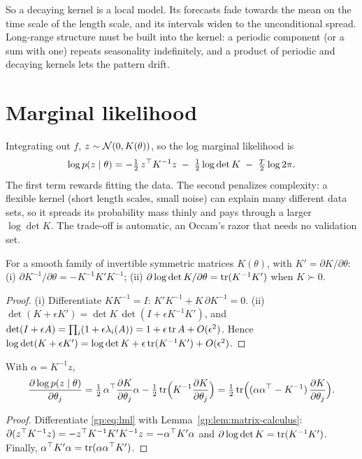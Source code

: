 So a decaying kernel is a local model. Its forecasts fade towards the mean
on the time scale of the length scale, and its intervals widen to the
unconditional spread. Long-range structure must be built into the kernel: a
periodic component (or a sum with one) repeats seasonality indefinitely, and a
product of periodic and decaying kernels lets the pattern drift.

\section{Marginal likelihood}\label{gp:sec:ml}

Integrating out $f$, $z\sim\mathcal{N}(0,K(\theta))$, so the log marginal likelihood is
\begin{equation}\label{gp:eq:lml}
  \log p(z\mid\theta) = -\tfrac12\, z^\top K^{-1}z \;-\; \tfrac12\log\det K \;-\; \tfrac T2\log2\pi .
\end{equation}
The first term rewards fitting the data. The second penalizes complexity: a
flexible kernel (short length scales, small noise) can explain many different
data sets, so it spreads its probability mass thinly and pays through a larger
$\log\det K$. The trade-off is automatic, an Occam's razor that needs no
validation set.

\begin{lemma}\label{gp:lem:matrix-calculus}
For a smooth family of invertible symmetric matrices $K(\theta)$, with $K'=\partial K/\partial\theta$:
(i) $\partial K^{-1}/\partial\theta = -K^{-1}K'K^{-1}$;
(ii) $\partial\log\det K/\partial\theta = \operatorname{tr}(K^{-1}K')$ when $K\succ0$.
\end{lemma}
\begin{proof}
(i) Differentiate $KK^{-1}=I$: $K'K^{-1}+K\,\partial K^{-1}=0$.
(ii) $\det(K+\epsilon K')=\det K\,\det(I+\epsilon K^{-1}K')$, and
$\det(I+\epsilon A)=\prod_i(1+\epsilon\lambda_i(A))=1+\epsilon\operatorname{tr} A+O(\epsilon^2)$.
Hence $\log\det(K+\epsilon K')=\log\det K+\epsilon\operatorname{tr}(K^{-1}K')+O(\epsilon^2)$.
\end{proof}

\begin{theorem}\label{gp:thm:gradient}
With $\alpha=K^{-1}z$,
\[
  \frac{\partial\log p(z\mid\theta)}{\partial\theta_j}
  = \tfrac12\,\alpha^\top\frac{\partial K}{\partial\theta_j}\alpha - \tfrac12\operatorname{tr}\!\Big(K^{-1}\frac{\partial K}{\partial\theta_j}\Big)
  = \tfrac12\operatorname{tr}\!\Big((\alpha\alpha^\top-K^{-1})\,\frac{\partial K}{\partial\theta_j}\Big).
\]
\end{theorem}
\begin{proof}
Differentiate \eqref{gp:eq:lml} with Lemma~\ref{gp:lem:matrix-calculus}:
$\partial(z^\top K^{-1}z)=-z^\top K^{-1}K'K^{-1}z=-\alpha^\top K'\alpha$ and
$\partial\log\det K=\operatorname{tr}(K^{-1}K')$. Finally, $\alpha^\top K'\alpha=\operatorname{tr}(\alpha\alpha^\top K')$.
\end{proof}

